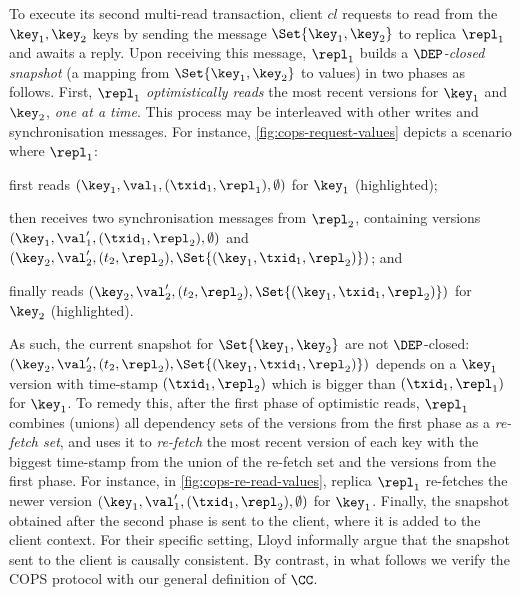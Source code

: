 To execute its second multi-read transaction,
client  \( cl \) requests to read from the $\key_1, \key_2$ keys by sending the message 
\( \Set{\key_1, \key_2} \) to replica $\repl_1$ and awaits a reply.
Upon receiving this message, $\repl_1$ builds a \emph{\( \DEP \)-closed snapshot} (a mapping from $\Set{\key_1, \key_2}$ to values) in two phases as follows. 
First, $\repl_1$ \emph{optimistically reads} the most recent versions for $\key_1$ and $\key_2$,
\emph{one at a time}. 
This process may be interleaved with other writes and synchronisation messages. 
For instance, \cref{fig:cops-request-values} depicts a scenario where \( \repl_1 \):
\begin{enumerate*}
	\item first reads \( (\key_1,\val_1,(\txid_1,\repl_1), \emptyset) \) for $\key_1$ (highlighted); %
	\item then receives two synchronisation messages from \( \repl_2 \), 
containing versions \( ( \key_1, \val'_1, (\txid_1,\repl_2),\emptyset ) \) and \( ( \key_2, \val'_2, (t_2,\repl_2),\Set{(\key_1,\txid_1,\repl_2)} ) \); and
	\item finally reads \( ( \key_2, \val'_2, (t_2,\repl_2),\Set{(\key_1,\txid_1,\repl_2)} ) \) for $\key_2$ (highlighted).
\end{enumerate*}
As such, the current snapshot for \( \Set{\key_1,\key_2}\) are not \( \DEP \)-closed: 
\( ( \key_2, \val'_2, (t_2,\repl_2),\Set{(\key_1,\txid_1,\repl_2)} ) \) depends on 
a $\key_1$ version with time-stamp $(\txid_1, \repl_2)$ which is bigger than $(\txid_1, \repl_1)$ for $\key_1$.
To remedy this, after the first phase of optimistic reads,
$\repl_1$ combines (unions) all dependency sets of the versions from the first phase as a \emph{re-fetch set},
and uses it to \emph{re-fetch}
the most recent version of each key with the biggest time-stamp 
from the union of the re-fetch set and the versions from the first phase.
For instance, in \cref{fig:cops-re-read-values}, replica $\repl_1$ re-fetches 
the newer version \( ( \key_1, \val'_1, (\txid_1,\repl_2),\emptyset ) \) for \( \key_1 \).
Finally, the snapshot obtained after the second phase 
is sent to the client, where  it is added to the  client
context.
For their specific setting, Lloyd \etal\citet{cops} {informally} argue that the snapshot sent to the client is causally consistent.
By contrast, in what follows we {verify} the COPS protocol with our
general definition of \(\CC\).


